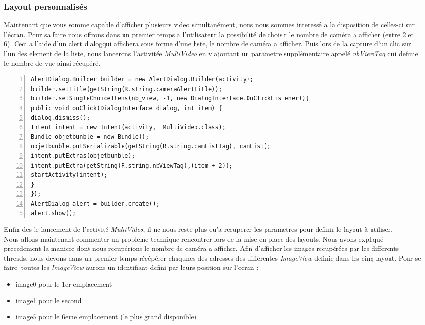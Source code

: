 \subsubsection{Layout personnalisés}
Maintenant que vous somme capable d'afficher plusieurs video simultanément,
nous nous sommes interessé a la disposition de celles-ci sur l'écran.
Pour sa faire nous offrons dans un premier temps a l'utilisateur la possibilité
de choisir le nombre de caméra a afficher (entre 2 et 6).\newline
Ceci a l'aide d'un alert dialogqui affichera sous forme d'une liste, le nombre
de caméra a afficher. Puis lors de la capture d'un clic sur l'un des element de
la liste, nous lancerons l'activitée \textit{MultiVideo} en y ajoutant un
parametre supplémentaire appelé \textit{nbViewTag} qui definie le nombre de vue
ainsi récupéré.
\begin{changemargin}{0cm}{-2cm}
\begin{lstlisting}[caption={Multi-Video launcher}, framexleftmargin=7mm,
numbers=left] 
AlertDialog.Builder builder = new AlertDialog.Builder(activity);
builder.setTitle(getString(R.string.cameraAlertTitle));
builder.setSingleChoiceItems(nb_view, -1, new DialogInterface.OnClickListener(){ 
public void onClick(DialogInterface dialog, int item) {
dialog.dismiss();
Intent intent = new Intent(activity,  MultiVideo.class);
Bundle objetbunble = new Bundle();
objetbunble.putSerializable(getString(R.string.camListTag), camList);
intent.putExtras(objetbunble);
intent.putExtra(getString(R.string.nbViewTag),(item + 2));
startActivity(intent);
}
});
AlertDialog alert = builder.create();
alert.show();
\end{lstlisting}    
\end{changemargin}
Enfin des le lancement de l'activité \textit{MultiVideo}, il ne nous reste plus
qu'a recuperer les parametres pour definir le layout à utiliser.\\
\newline\indent Nous allons maintenant commenter un probleme technique
rencontrer lors de la mise en place des layouts.
Nous avons expliqué precedement la maniere dont nous recupérions le nombre de
caméra a afficher. Afin d'afficher les images recupérées par les differents
threads, nous devons dans un premier temps récépérer chaqunes des adresses des
differentes \textit{ImageView} definie dans les cinq layout. \newline Pour se
faire, toutes les \textit{ImageView} aurons un identifiant defini par leurs
position sur l'ecran :
\begin{itemize}
\item image0 pour le 1er emplacement
\item image1 pour le second
\item image5 pour le 6eme emplacement (le plus grand disponible)
\end{itemize}
